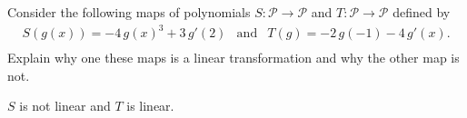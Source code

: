 
\begin{exerciseStatement}


Consider the following maps of polynomials \(S:\mathcal{P}\rightarrow\mathcal{P}\) and \(T:\mathcal{P}\rightarrow\mathcal{P}\) defined by 
\begin{align*} S(g(x))= -4 \, g\left(x\right)^{3} + 3 \, g'\left(2\right)  & \text{and} & T(g)= -2 \, g\left(-1\right) - 4 \, g'\left(x\right) . \\ \end{align*}
             Explain why one these maps is a linear transformation and why the other map is not. 


\end{exerciseStatement}
    
\begin{exerciseAnswer} 


\(S\) is not linear and \(T\) is linear.


\end{exerciseAnswer}
    
